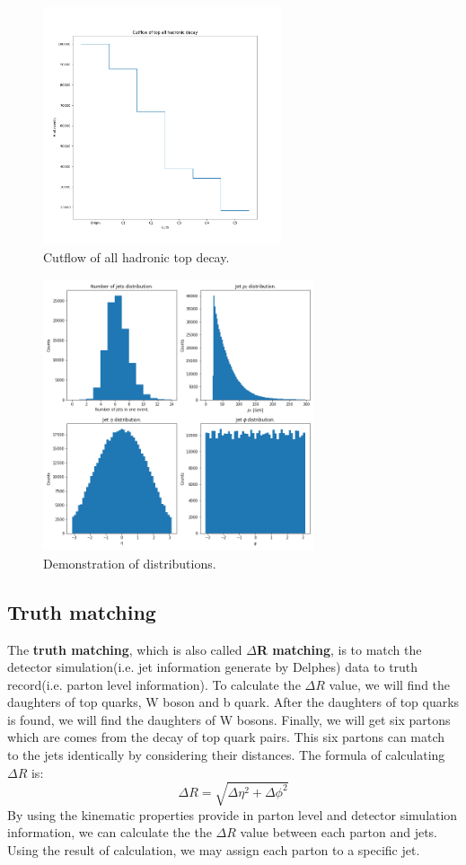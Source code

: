 \begin{figure}[!h]
	\includegraphics[width=0.8\linewidth, height=7cm,keepaspectratio=true]{Figures/ttbar_cutflow.png}
	\caption{Cutflow of all hadronic top decay.}
	\label{fig:cutflow}
\end{figure}
\begin{figure}[H]
	\includegraphics[width=0.8\linewidth, height=8cm,keepaspectratio=true]{Figures/ttbar_kinematic_dist.png}
	\caption{Demonstration of distributions.}
	\label{fig:kinematic dist}
\end{figure}
\newpage

\subsection{Truth matching}\label{subsec:Truth matching}
The \textbf{truth matching}, which is also called \textbf{$\Delta$R matching},  is to match the detector simulation(i.e. jet information generate by Delphes) data to truth record(i.e. parton level information).  To calculate the $\Delta R$ value, we will find the daughters of top quarks, W boson and b quark. After the daughters of top quarks is found, we will find the daughters of W bosons. Finally, we will get six partons which are comes from the decay of top quark pairs. This six partons can match to the jets identically by considering their distances. The formula of calculating $\Delta R$ is:
\begin{equation}
	\Delta R = \sqrt{\Delta\eta^{2} + \Delta\phi^{2}}
\end{equation}
By using the kinematic properties provide in parton level and detector simulation information, we can calculate the the $\Delta R$ value between each parton and jets. Using the result of calculation, we may assign each parton to a specific jet. 

